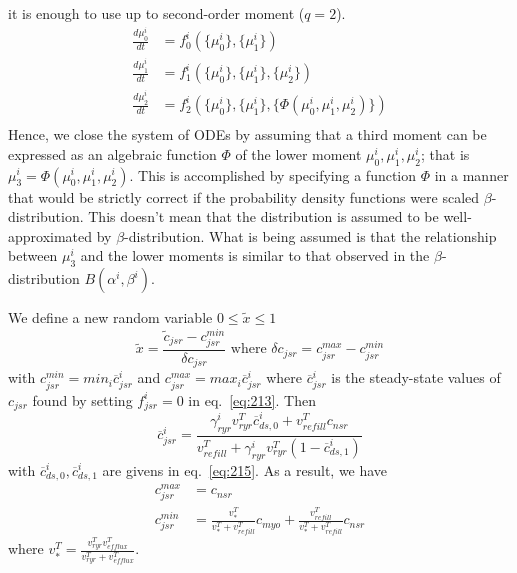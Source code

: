 it is enough to use up to second-order moment
($q=2$). 
\begin{equation}
  \label{eq:227}
  \begin{split}
    \frac{d\mu^i_0}{dt} &= f^i_0(\{\mu^i_0\}, \{ \mu^i_1 \} ) \\
    \frac{d\mu^i_1}{dt} &= f^i_1(\{\mu^i_0\}, \{\mu^i_1\}, \{\mu^i_2\} )
    \\
    \frac{d\mu^i_2}{dt} &= f^i_2(\{ \mu^i_0 \}, \{\mu^i_1 \}, \{\Phi(\mu^i_0,
    \mu^i_1, \mu^i_2 ) \}) \\
  \end{split}
\end{equation}
Hence, we close the system of ODEs by assuming that a third
moment can be expressed as an algebraic function $\Phi$ of the lower
moment $\mu^i_0, \mu^i_1, \mu^i_2$; that is  $\mu^i_3 = \Phi(\mu^i_0,
\mu^i_1, \mu^i_2)$. This is accomplished by specifying a function
$\Phi$ in a manner that would be strictly correct if the probability
density functions were scaled $\beta$-distribution. This doesn't mean
that the distribution is assumed to be well-approximated by
$\beta$-distribution. What is being assumed is that the relationship
between $\mu^i_3$ and the lower moments is similar to that observed in
the $\beta$-distribution $B(\alpha^i, \beta^i)$. 


We define a new random variable $0 \le \tilde{x} \le 1$
\begin{equation}
  \label{eq:240}
  \tilde{x} = \frac{\tilde{c}_{jsr}-c^{min}_{jsr}}{\delta c_{jsr}}
  \text{ where } \delta c_{jsr} = c^{max}_{jsr} - c^{min}_{jsr}
\end{equation}
with $c^{min}_{jsr} = {min}_{i} \overline{c}^i_{jsr}$ and $c^{max}_{jsr} =
{max}_i \overline{c}^i_{jsr}$ where $\overline{c}^i_{jsr}$ is the steady-state
values of $c_{jsr}$ found by setting $f^i_{jsr}=0$ in
eq.~\eqref{eq:213}. Then
\begin{equation}
  \label{eq:247}
  \overline{c}^i_{jsr} = \frac{\gamma^i_{ryr} v^T_{ryr}\overline{c}^i_{ds,0} +
    v^T_{refill} c_{nsr} } {v^T_{refill} + \gamma^i_{ryr} v^T_{ryr}(1-\overline{c}^i_{ds,1})}
\end{equation}
with $\overline{c}^i_{ds,0}, \overline{c}^i_{ds,1}$ are givens in
eq.~\eqref{eq:215}.  As a result, we have
\begin{equation}
  \label{eq:241}
  \begin{split}
    c^{max}_{jsr} &= c_{nsr} \\
    c^{min}_{jsr} &= \frac{v^T_*}{v^T_* + v^T_{refill}} c_{myo} + \frac{v^T_{refill}}{v^T_* + v^T_{refill}} c_{nsr}
  \end{split}
\end{equation}
where $v^T_* = \frac{v^T_{ryr} v^T_{efflux}}{v^T_{ryr} +
  v^T_{efflux}}$. 

